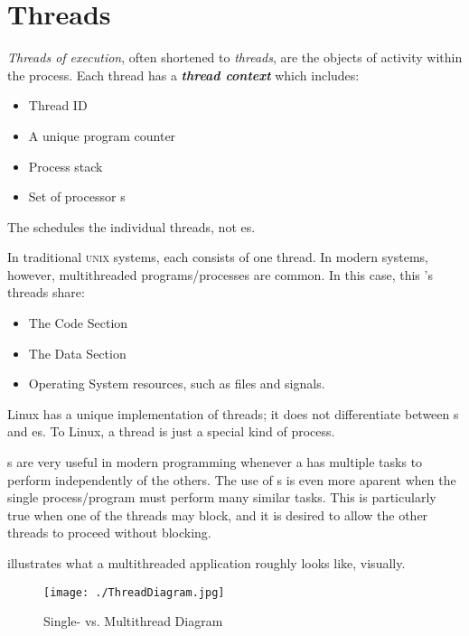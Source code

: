 \section{Threads}\label{sec:Threads}
\begin{definition}[Thread]\label{def:Thread}
  \emph{Threads of execution}, often shortened to \emph{threads}, are the objects of activity within the process.
  Each thread has a \textbf{\emph{thread context}} which includes:
  \begin{itemize}[noitemsep]
  \item Thread ID
  \item A unique program counter
  \item Process stack
  \item Set of processor s
  \end{itemize}

  The  schedules the individual threads, not es.

  In traditional \textsc{unix} systems, each  consists of one thread.
  In modern systems, however, multithreaded programs/processes are common.
  In this case, this 's threads share:
  \begin{itemize}[noitemsep]
  \item The Code Section
  \item The Data Section
  \item Operating System resources, such as files and signals.
  \end{itemize}

  \begin{remark}\label{rmk:Linux_Threads}
    Linux has a unique implementation of threads; it does not differentiate between s and es.
    To Linux, a thread is just a special kind of process.
  \end{remark}
\end{definition}

s are very useful in modern programming whenever a  has multiple tasks to perform independently of the others.
The use of s is even more aparent when the single process/program must perform many similar tasks.
This is particularly true when one of the threads may block, and it is desired to allow the other threads to proceed without blocking.

 illustrates what a multithreaded application roughly looks like, visually.
\begin{figure}[h!tbp]
  \centering
  \texttt{[image: ./ThreadDiagram.jpg]}
  \caption{Single- vs. Multithread Diagram}
  \label{fig:Thread_Diagram}
\end{figure}

